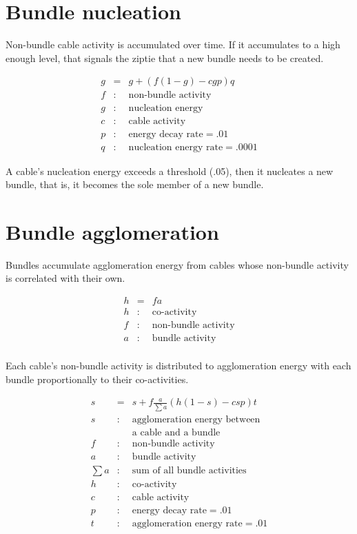 \documentclass[oneside,twocolumn]{article}
\begin{document}
\section*{\color{copper} Bundle nucleation}

Non-bundle cable activity is accumulated over time. If it accumulates to a high enough level, that signals the ziptie that a new bundle needs to be created.

\begin{eqnarray*}
g &=& g + (f  (1 - g)  - c  g  p )  q\\ 
f &:& \mbox{non-bundle activity}\\
g &:& \mbox{nucleation energy}\\
c &:& \mbox{cable activity}\\
p &:& \mbox{energy decay rate} = .01\\
q &:& \mbox{nucleation energy rate} = .0001
\end{eqnarray*}

A cable's nucleation energy exceeds a threshold (.05),  then it nucleates a new bundle, that is, it becomes the sole member of a new bundle.
          
\section*{\color{copper} Bundle agglomeration}

Bundles accumulate agglomeration energy from cables whose non-bundle activity is correlated with their own. 

\begin{eqnarray*}
h &=& fa\\ 
h &:& \mbox{co-activity}\\
f &:& \mbox{non-bundle activity}\\
a &:& \mbox{bundle activity}\\
\end{eqnarray*}

Each cable's non-bundle activity is distributed to agglomeration energy with each bundle proportionally to their co-activities.

\begin{eqnarray*}
s &=& s + f  \frac{a}{\sum a} (h (1-s) - c s p) t\\ 
s &:& \mbox{agglomeration energy between}\\
&& \mbox{a cable and a bundle}\\
f &:& \mbox{non-bundle activity}\\
a &:& \mbox{bundle activity}\\
\sum a &:& \mbox{sum of all bundle activities}\\
h &:& \mbox{co-activity}\\
c &:& \mbox{cable activity}\\
p &:& \mbox{energy decay rate} = .01\\
t &:& \mbox{agglomeration energy rate} = .01\\
\end{eqnarray*}
                                      
\end{document}
